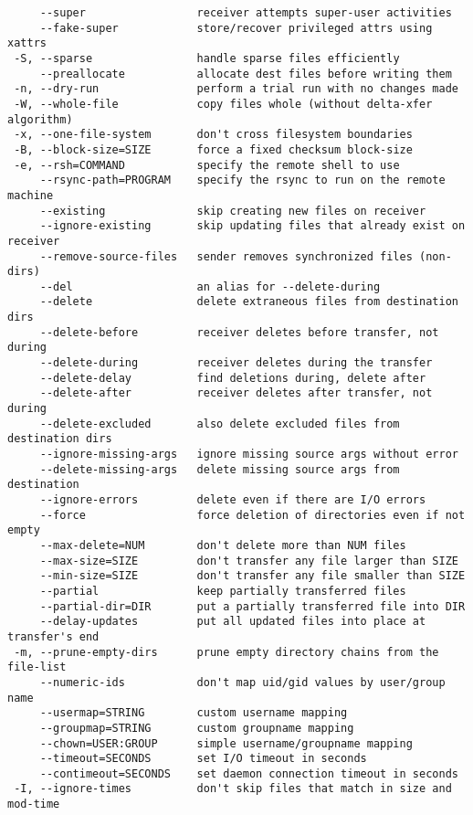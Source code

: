 \begin{lstlisting}
     --super                 receiver attempts super-user activities
     --fake-super            store/recover privileged attrs using xattrs
 -S, --sparse                handle sparse files efficiently
     --preallocate           allocate dest files before writing them
 -n, --dry-run               perform a trial run with no changes made
 -W, --whole-file            copy files whole (without delta-xfer algorithm)
 -x, --one-file-system       don't cross filesystem boundaries
 -B, --block-size=SIZE       force a fixed checksum block-size
 -e, --rsh=COMMAND           specify the remote shell to use
     --rsync-path=PROGRAM    specify the rsync to run on the remote machine
     --existing              skip creating new files on receiver
     --ignore-existing       skip updating files that already exist on receiver
     --remove-source-files   sender removes synchronized files (non-dirs)
     --del                   an alias for --delete-during
     --delete                delete extraneous files from destination dirs
     --delete-before         receiver deletes before transfer, not during
     --delete-during         receiver deletes during the transfer
     --delete-delay          find deletions during, delete after
     --delete-after          receiver deletes after transfer, not during
     --delete-excluded       also delete excluded files from destination dirs
     --ignore-missing-args   ignore missing source args without error
     --delete-missing-args   delete missing source args from destination
     --ignore-errors         delete even if there are I/O errors
     --force                 force deletion of directories even if not empty
     --max-delete=NUM        don't delete more than NUM files
     --max-size=SIZE         don't transfer any file larger than SIZE
     --min-size=SIZE         don't transfer any file smaller than SIZE
     --partial               keep partially transferred files
     --partial-dir=DIR       put a partially transferred file into DIR
     --delay-updates         put all updated files into place at transfer's end
 -m, --prune-empty-dirs      prune empty directory chains from the file-list
     --numeric-ids           don't map uid/gid values by user/group name
     --usermap=STRING        custom username mapping
     --groupmap=STRING       custom groupname mapping
     --chown=USER:GROUP      simple username/groupname mapping
     --timeout=SECONDS       set I/O timeout in seconds
     --contimeout=SECONDS    set daemon connection timeout in seconds
 -I, --ignore-times          don't skip files that match in size and mod-time

\end{lstlisting}
